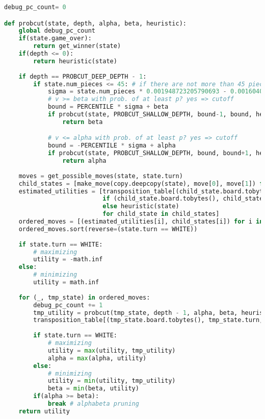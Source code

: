 \begin{lstlisting}[language=Python]
debug_pc_count= 0

def probcut(state, depth, alpha, beta, heuristic):
    global debug_pc_count
    if(state.game_over):
        return get_winner(state)
    if(depth <= 0):
        return heuristic(state)
    
    if depth == PROBCUT_DEEP_DEPTH - 1:
        if state.num_pieces <= 45: # if there are not more than 45 pieces on the board sigma can be calculated based on statistic values with the combined_heuristic
            sigma = state.num_pieces * 0.001948723205790693 - 0.001604049443613545
            # v >= beta with prob. of at least p? yes => cutoff
            bound = PERCENTILE * sigma + beta
            if probcut(state, PROBCUT_SHALLOW_DEPTH, bound-1, bound, heuristic) >= bound:
                return beta

            # v <= alpha with prob. of at least p? yes => cutoff
            bound = -PERCENTILE * sigma + alpha
            if probcut(state, PROBCUT_SHALLOW_DEPTH, bound, bound+1, heuristic) <= bound:
                return alpha
    
    moves = get_possible_moves(state, state.turn)
    child_states = [make_move(copy.deepcopy(state), move[0], move[1]) for move in moves]
    estimated_utilities = [transposition_table[(child_state.board.tobytes(), child_state.turn, heuristic)]
                           if (child_state.board.tobytes(), child_state.turn, heuristic) in transposition_table
                           else heuristic(state)
                           for child_state in child_states]
    ordered_moves = [(estimated_utilities[i], child_states[i]) for i in range(len(moves))]
    ordered_moves.sort(reverse=(state.turn == WHITE))
    
    if state.turn == WHITE:
        # maximizing
        utility = -math.inf
    else:
        # minimizing
        utility = math.inf
        
    for (_, tmp_state) in ordered_moves:
        debug_pc_count += 1
        tmp_utility = probcut(tmp_state, depth - 1, alpha, beta, heuristic)
        transposition_table[(tmp_state.board.tobytes(), tmp_state.turn, heuristic)] = tmp_utility
        
        if state.turn == WHITE:
            # maximizing
            utility = max(utility, tmp_utility)
            alpha = max(alpha, utility)
        else:
            # minimizing
            utility = min(utility, tmp_utility)
            beta = min(beta, utility)
        if(alpha >= beta):
            break # alphabeta pruning
    return utility
\end{lstlisting}

